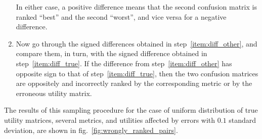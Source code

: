 \documentclass[\ifafour a4paper,12pt,\else a5paper,10pt,\fi%
onecolumn,oneside,article,%
british%
]{memoir}
\theoremstyle{remark}
\theoremstyle{innote}
\renewcommand*{\|}[1][]{\nonscript\:#1\vert\nonscript\:\mathopen{}}
\newcommand*{\fig}{fig.}%
\begin{document}
\begin{enumerate}[label=\arabic*.,ref=\arabic*]
\begin{enumerate}[label=\alph*.]
\end{enumerate}
In either case, a positive difference means that the second confusion matrix is ranked \enquote{best} and the second \enquote{worst}, and vice versa for a negative difference.
\item Now go through the signed differences obtained in step~\ref{item:diff_other}, and compare them, in turn, with the signed difference obtained in step~\ref{item:diff_true}. If the difference from step~\ref{item:diff_other} has opposite sign to that of step~\ref{item:diff_true}, then the two confusion matrices are oppositely and incorrectly ranked by the corresponding metric or by the erroneous utility matrix.
\end{enumerate}

The results of this sampling procedure for the case of uniform distribution of true utility matrices, several metrics, and utilities affected by errors with $0.1$ standard deviation, are shown in \fig~\ref{fig:wrongly_ranked_pairs}.
\end{document}
